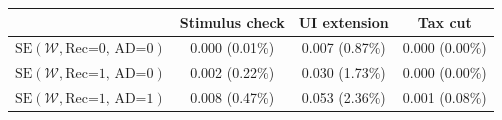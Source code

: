 \begin{tabular}{@{}lccc@{}}
\toprule
                          & Stimulus check      & UI extension    & Tax cut    \\  \midrule
$\mathrm{SE}(\mathcal{W}, \text{Rec=0, AD=0})$ & 0.000 (0.01\%)  & 0.007 (0.87\%)  & 0.000 (0.00\%)     \\
$\mathrm{SE}(\mathcal{W}, \text{Rec=1, AD=0})$ & 0.002 (0.22\%)  & 0.030 (1.73\%)  & 0.000 (0.00\%)     \\
$\mathrm{SE}(\mathcal{W}, \text{Rec=1, AD=1})$ & 0.008 (0.47\%)  & 0.053 (2.36\%)  & 0.001 (0.08\%)     \\ \bottomrule
\end{tabular}
